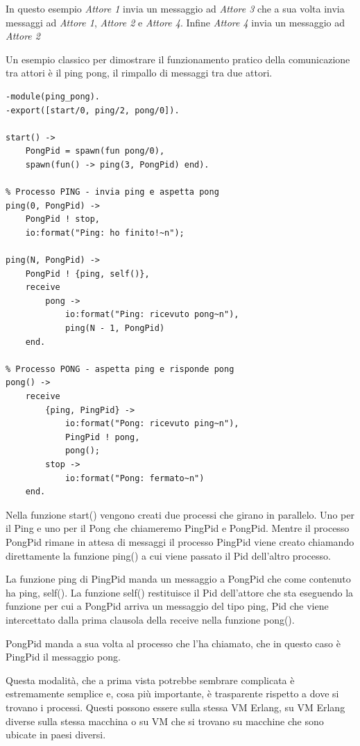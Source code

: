 In questo esempio \textit{Attore 1} invia un messaggio ad \textit{Attore 3} che a sua volta invia messaggi ad \textit{Attore 1}, \textit{Attore 2} e \textit{Attore 4}. Infine \textit{Attore 4} invia un messaggio ad \textit{Attore 2}

Un esempio classico per dimostrare il funzionamento pratico della comunicazione tra attori \`e il ping pong, il rimpallo di messaggi tra due attori.

\begin{verbatim}
-module(ping_pong).
-export([start/0, ping/2, pong/0]).

start() ->
	PongPid = spawn(fun pong/0),
	spawn(fun() -> ping(3, PongPid) end).

% Processo PING - invia ping e aspetta pong
ping(0, PongPid) ->
	PongPid ! stop,
	io:format("Ping: ho finito!~n");

ping(N, PongPid) ->
	PongPid ! {ping, self()},
	receive
		pong ->
			io:format("Ping: ricevuto pong~n"),
			ping(N - 1, PongPid)
	end.

% Processo PONG - aspetta ping e risponde pong
pong() ->
	receive
		{ping, PingPid} ->
			io:format("Pong: ricevuto ping~n"),
			PingPid ! pong,
			pong();
		stop ->
			io:format("Pong: fermato~n")
	end.
\end{verbatim}

Nella funzione start() vengono creati due processi che girano in parallelo. Uno per il Ping e uno per il Pong che chiameremo PingPid e PongPid.
Mentre il processo PongPid rimane in attesa di messaggi il processo PingPid viene creato chiamando direttamente la funzione ping() a cui viene passato il Pid dell'altro processo.

La funzione ping di PingPid manda un messaggio a PongPid che come contenuto ha {ping, self()}. La funzione self() restituisce il Pid dell'attore che sta eseguendo la funzione per cui a PongPid arriva un messaggio del tipo {ping, Pid} che viene intercettato dalla prima clausola della receive nella funzione pong().

PongPid manda a sua volta al processo che l'ha chiamato, che in questo caso \`e PingPid il messaggio pong.

Questa modalit\`a, che a prima vista potrebbe sembrare complicata \`e estremamente semplice e, cosa pi\`u importante, \`e trasparente rispetto a dove si trovano i processi. Questi possono essere sulla stessa VM Erlang, su VM Erlang diverse sulla stessa macchina o su VM che si trovano su macchine che sono ubicate in paesi diversi.


